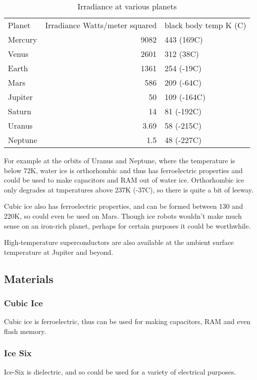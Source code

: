 \begin{table}
  \caption{Irradiance at various planets}
  \begin{tabular}{LR}
    Planet & Irradiance Watts/meter squared & black body temp K (C) \\
    Mercury & 9082\cite{nasaMercury} & 443 (169C)\cite{bbtemp}\\
    Venus & 2601\cite{nasaVenus} & 312\cite{bbtemp} (38C) \\
    Earth & 1361\cite{nasaEarth} & 254\cite{nasaEarth} (-19C) \\
    Mars & 586\cite{nasaMars} & 209\cite{nasaMars} (-64C) \\
    Jupiter & 50\cite{nasaJupiter} & 109\cite{nasaJupiter} (-164C) \\
    Saturn & 14\cite{nasaSaturn} & 81\cite{nasaJupiter} (-192C)\\ 
    Uranus & 3.69\cite{nasaUranus} & 58\cite{nasaUranus} (-215C)\\
    Neptune & 1.5\cite{nasaNeptune} & 48\cite{bbtemp} (-227C) \\
\end{tabular}
\end{table}

For example at the orbits of Uranus and Neptune, where the temperature is below
72K, water ice is orthorhombic and thus has ferroelectric properties and could
be used to make capacitors and RAM out of water ice. Orthorhombic ice only
degrades at tmperatures above 237K (-37C), so there is quite a bit of leeway. 

Cubic ice also has ferroelectric properties, and can be formed between 130 and
220K, so could even be used on Mars. Though ice robots wouldn't make much sense
on an iron-rich planet, perhaps for certain purposes it could be worthwhile. 


High-temperature superconductors are also available at the ambient surface 
temperature at Jupiter and beyond.
\subsection{Materials}
\subsubsection{Cubic Ice}
Cubic ice is ferroelectric\cite{Cubic Ice}, thus can be used for making
capacitors, RAM and even flash memory. 

\subsubsection{Ice Six}
Ice-Six is dielectric\cite{iceSix}, and so could be used for a variety of
electrical purposes. 


